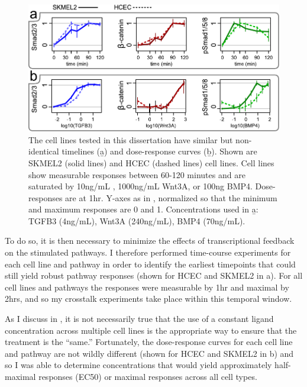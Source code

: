   \begin{figure}[!bt]
  \centering
  \includegraphics[width=6in]{FIGS/insulation/doseTime.pdf}
  {\singlespacing 
  \caption[Dose-response and timecourse of \tgfbsf\ and Wnt.]
        { The cell lines tested in this dissertation have similar
          but non-identical timelines (\b{a}) and
          dose-response curves (\b{b}). Shown
          are SKMEL2 (solid lines) and HCEC (dashed lines) cell lines.
          Cell lines show measurable responses between 60-120 minutes
          and are saturated by 10ng/mL , 1000ng/mL Wnt3A,
          or 100ng BMP4. Dose-responses are at 1hr.
          Y-axes as in ,
          normalized so that the minimum and maximum responses
          are 0 and 1. Concentrations used in \b{a}:
		  TGFB3 (4ng/mL), Wnt3A (240ng/mL), BMP4 (70ng/mL).}
  \label{fig:insulation:doseTime}}
  \end{figure}
  

To do so, it is then necessary to minimize the effects of transcriptional
feedback on the stimulated pathways. I therefore performed
time-course experiments for each cell line and pathway in order to identify the
earliest timepoints that could still yield robust pathway responses
(shown for HCEC and SKMEL2 in a). For
all cell lines and pathways the responses were measurable by 1hr and
maximal by 2hrs, and so my crosstalk experiments take place within
this temporal window.
  

As I discuss in , it is not necessarily true
that the use of a constant ligand concentration across multiple cell lines
is the appropriate way to ensure that the treatment is the ``same.'' Fortunately,
the dose-response curves for each cell line and pathway are not wildly different
(shown for HCEC and SKMEL2 in b) and so I was able
to determine concentrations that would yield approximately half-maximal responses (EC50)
or maximal responses across all cell types.


